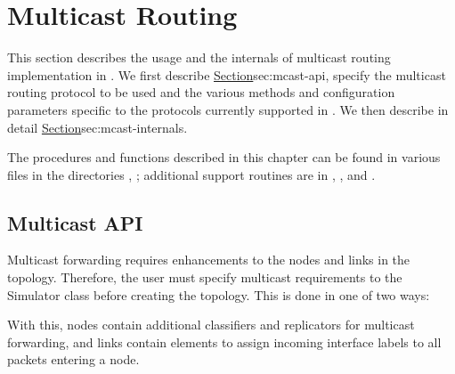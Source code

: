\chapter{Multicast Routing}
\label{chap:multicast}

This section describes the usage and the internals of multicast
routing implementation in \ns.
We first describe 
\href{the user interface to enable multicast routing}{Section}{sec:mcast-api},
specify the multicast routing protocol to be used and the
various methods and configuration parameters specific to the
protocols currently supported in \ns.
We then describe in detail 
\href{the internals and the architecture of the
multicast routing implementation in \ns}{Section}{sec:mcast-internals}.

The procedures and functions described in this chapter can be found in
various files in the directories , ;
additional support routines
are in ,
, and .

\section{Multicast API}
\label{sec:mcast-api}

Multicast forwarding requires enhancements
to the nodes and links in the topology.
Therefore, the user must specify multicast requirements
to the Simulator class before creating the topology.
This is done in one of two ways:
With this, nodes contain additional classifiers and replicators
for multicast forwarding, and links contain elements to assign
incoming interface labels to all packets entering a node.

